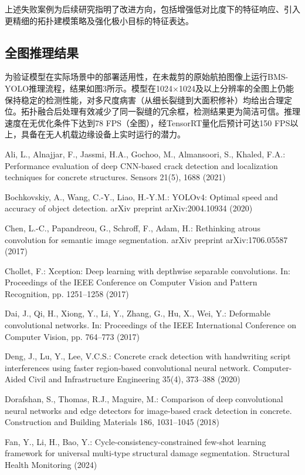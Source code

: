 \documentclass[twocolumn]{sn-jnl}
\begin{document}
	上述失败案例为后续研究指明了改进方向，包括增强低对比度下的特征响应、引入更精细的拓扑建模策略及强化极小目标的特征表达。
	
	\subsection{全图推理结果}
	为验证模型在实际场景中的部署适用性，在未裁剪的原始航拍图像上运行BMS-YOLO推理流程，结果如图3所示。模型在1024×1024及以上分辨率的全图上仍能保持稳定的检测性能，对多尺度病害（从细长裂缝到大面积修补）均给出合理定位。拓扑融合后处理有效减少了同一裂缝的冗余框，检测结果更为简洁可信。推理速度在无优化条件下达到78 FPS（全图），经TensorRT量化后预计可达150 FPS以上，具备在无人机载边缘设备上实时运行的潜力。
	
		Ali, L., Alnajjar, F., Jassmi, H.A., Gochoo, M., Almansoori, S., Khaled, F.A.: Performance evaluation of deep CNN-based crack detection and localization techniques for concrete structures. Sensors 21(5), 1688 (2021)
		
		Bochkovskiy, A., Wang, C.-Y., Liao, H.-Y.M.: YOLOv4: Optimal speed and accuracy of object detection. arXiv preprint arXiv:2004.10934 (2020)
		
		Chen, L.-C., Papandreou, G., Schroff, F., Adam, H.: Rethinking atrous convolution for semantic image segmentation. arXiv preprint arXiv:1706.05587 (2017)
		
		Chollet, F.: Xception: Deep learning with depthwise separable convolutions. In: Proceedings of the IEEE Conference on Computer Vision and Pattern Recognition, pp. 1251–1258 (2017)
		
		Dai, J., Qi, H., Xiong, Y., Li, Y., Zhang, G., Hu, X., Wei, Y.: Deformable convolutional networks. In: Proceedings of the IEEE International Conference on Computer Vision, pp. 764–773 (2017)
		
		Deng, J., Lu, Y., Lee, V.C.S.: Concrete crack detection with handwriting script interferences using faster region-based convolutional neural network. Computer-Aided Civil and Infrastructure Engineering 35(4), 373–388 (2020)
		
		Dorafshan, S., Thomas, R.J., Maguire, M.: Comparison of deep convolutional neural networks and edge detectors for image-based crack detection in concrete. Construction and Building Materials 186, 1031–1045 (2018)
		
		Fan, Y., Li, H., Bao, Y.: Cycle-consistency-constrained few-shot learning framework for universal multi-type structural damage segmentation. Structural Health Monitoring (2024)
		
\end{document}
